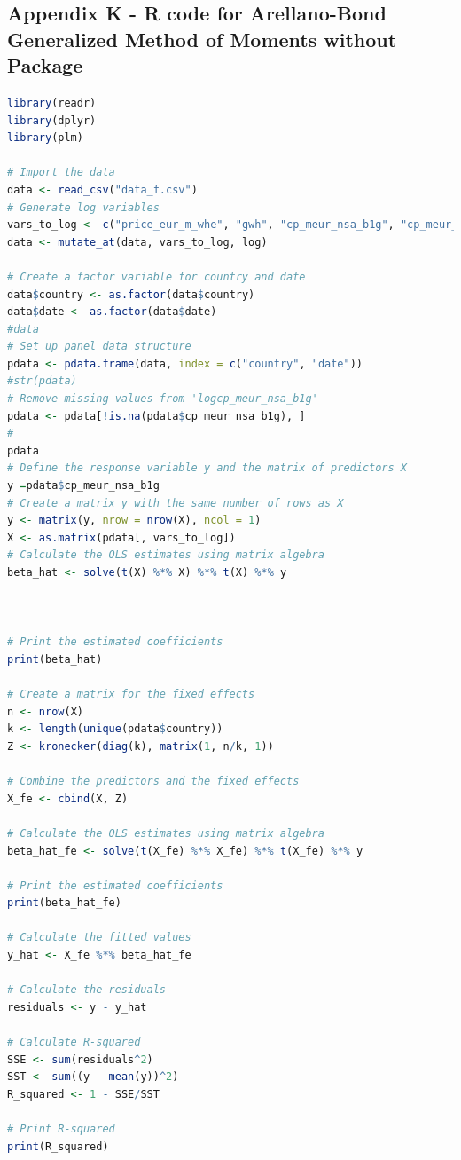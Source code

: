 \documentclass[12pt]{article}
\begin{document}
\newpage
\subsection{Appendix K - R code for Arellano-Bond Generalized Method of Moments without Package}
\begin{lstlisting}[language=R]
library(readr)
library(dplyr)
library(plm)

# Import the data
data <- read_csv("data_f.csv")
# Generate log variables
vars_to_log <- c("price_eur_m_whe", "gwh", "cp_meur_nsa_b1g", "cp_meur_nsa_d1", "cp_meur_nsa_d11", "cp_meur_nsa_p6", "cp_meur_nsa_p7", "ths_hw_b_e_nsa_emp_dc", "ths_hw_c_nsa_emp_dc", "ths_hw_j_nsa_emp_dc", "ths_hw_g_i_nsa_emp_dc", "ths_hw_total_nsa_emp_dc", "exp_e7000_gwh")
data <- mutate_at(data, vars_to_log, log)

# Create a factor variable for country and date
data$country <- as.factor(data$country)
data$date <- as.factor(data$date)
#data 
# Set up panel data structure
pdata <- pdata.frame(data, index = c("country", "date"))
#str(pdata)
# Remove missing values from 'logcp_meur_nsa_b1g'
pdata <- pdata[!is.na(pdata$cp_meur_nsa_b1g), ]
#
pdata
# Define the response variable y and the matrix of predictors X
y =pdata$cp_meur_nsa_b1g
# Create a matrix y with the same number of rows as X
y <- matrix(y, nrow = nrow(X), ncol = 1)
X <- as.matrix(pdata[, vars_to_log])
# Calculate the OLS estimates using matrix algebra
beta_hat <- solve(t(X) %*% X) %*% t(X) %*% y



# Print the estimated coefficients
print(beta_hat)

# Create a matrix for the fixed effects
n <- nrow(X)
k <- length(unique(pdata$country))
Z <- kronecker(diag(k), matrix(1, n/k, 1))

# Combine the predictors and the fixed effects
X_fe <- cbind(X, Z)

# Calculate the OLS estimates using matrix algebra
beta_hat_fe <- solve(t(X_fe) %*% X_fe) %*% t(X_fe) %*% y

# Print the estimated coefficients
print(beta_hat_fe)

# Calculate the fitted values
y_hat <- X_fe %*% beta_hat_fe

# Calculate the residuals
residuals <- y - y_hat

# Calculate R-squared
SSE <- sum(residuals^2)
SST <- sum((y - mean(y))^2)
R_squared <- 1 - SSE/SST

# Print R-squared
print(R_squared)


\end{lstlisting}
\end{document}
